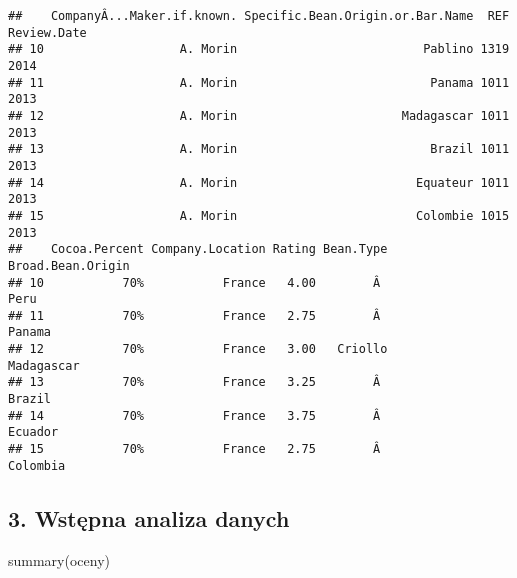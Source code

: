 \documentclass[
]{article}
\newenvironment{Shaded}{\begin{snugshade}}{\end{snugshade}}
\newcommand{\AttributeTok}[1]{\textcolor[rgb]{0.77,0.63,0.00}{#1}}
\newcommand{\FunctionTok}[1]{\textcolor[rgb]{0.00,0.00,0.00}{#1}}
\newcommand{\NormalTok}[1]{#1}
\newcommand{\OtherTok}[1]{\textcolor[rgb]{0.56,0.35,0.01}{#1}}
\newcommand{\SpecialCharTok}[1]{\textcolor[rgb]{0.00,0.00,0.00}{#1}}
\newcommand{\StringTok}[1]{\textcolor[rgb]{0.31,0.60,0.02}{#1}}
\begin{document}
\begin{verbatim}
##    CompanyÂ...Maker.if.known. Specific.Bean.Origin.or.Bar.Name  REF Review.Date
## 10                   A. Morin                          Pablino 1319        2014
## 11                   A. Morin                           Panama 1011        2013
## 12                   A. Morin                       Madagascar 1011        2013
## 13                   A. Morin                           Brazil 1011        2013
## 14                   A. Morin                         Equateur 1011        2013
## 15                   A. Morin                         Colombie 1015        2013
##    Cocoa.Percent Company.Location Rating Bean.Type Broad.Bean.Origin
## 10           70%           France   4.00        Â               Peru
## 11           70%           France   2.75        Â             Panama
## 12           70%           France   3.00   Criollo        Madagascar
## 13           70%           France   3.25        Â             Brazil
## 14           70%           France   3.75        Â            Ecuador
## 15           70%           France   2.75        Â           Colombia
\end{verbatim}

\begin{Shaded}
\end{Shaded}

\hypertarget{wstux119pna-analiza-danych-1}{%
\subsection{3. Wstępna analiza
danych}\label{wstux119pna-analiza-danych-1}}

\begin{Shaded}
\begin{Highlighting}[]
\FunctionTok{summary}\NormalTok{(oceny)}
\end{Highlighting}
\end{Shaded}
\end{document}
